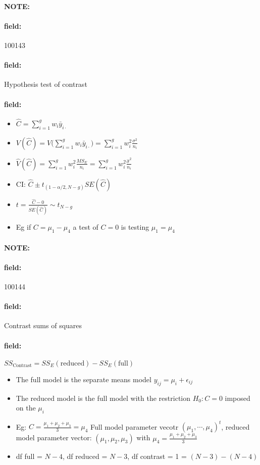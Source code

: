 \documentclass[12pt]{article}
\newenvironment{note}{\paragraph{NOTE:}}{}
\newenvironment{field}{\paragraph{field:}}{}
\begin{document}
\begin{note}
 \begin{field}
  \tiny 100143
 \end{field}
 \begin{field}
  Hypothesis test of contrast
 \end{field}
 \begin{field}
  \begin{itemize}
   \item $\hat{C} = \sum_{i=1}^g w_i \bar{y}_{i\cdot}$
   \item $V(\hat{C}) = V\bigg(\sum_{i=1}^g w_i\bar{y}_{i\cdot}\bigg) = \sum_{i=1}^g w_i^2 \frac{\sigma^2}{n_i}$
   \item $\hat{V}(\hat{C}) = \sum_{i=1}^g w_i^2 \frac{MS_E}{n_i} =  \sum_{i=1}^g w_i^2 \frac{\hat{\sigma}^2}{n_i} $
   \item CI: $\hat{C} \pm t_{(1 - \alpha/2, N-g)}SE(\hat{C})$
   \item $t = \frac{\hat{C} - 0}{SE(\hat{C})} \sim t_{N-g}$
   \item Eg if $C = \mu_1 - \mu_4$ a test of $C = 0$ is testing $\mu_1 = \mu_4$
  \end{itemize}
 \end{field}
\end{note}

\begin{note}
 \begin{field}
  \tiny 100144
 \end{field}
 \begin{field}
  Contrast sums of squares
 \end{field}
 \begin{field}
  $SS_{\text{Contrast}} = SS_E(\text{reduced}) - SS_E(\text{full})$

  \begin{itemize}
   \item The full model is the separate means model $y_{ij} = \mu_i + \epsilon_{ij}$
   \item The reduced model is the full model with the restriction $H_0: C = 0$ imposed on the $\mu_i$
   \item Eg: $C = \frac{\mu_1 + \mu_2 + \mu_3}{3} = \mu_4$
         Full model parameter vecotr $(\mu_1, \cdots, \mu_4)^t$, reduced model parameter vector: $(\mu_1, \mu_2, \mu_3)$ with $\mu_4 = \frac{\mu_1+ \mu_2 + \mu_3}{3}$
   \item df full = $N-4$, df reduced = $N-3$, df contrast = 1 = $(N-3) - (N-4)$
  \end{itemize}
 \end{field}
\end{note}
\end{document}

